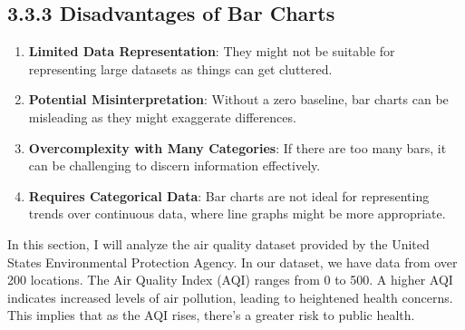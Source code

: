 \documentclass{article}\usepackage[]{graphicx}\usepackage[]{xcolor}
\begin{document}
\subsection*{3.3.3 Disadvantages of Bar Charts}

\begin{enumerate}
    \item \textbf{Limited Data Representation}: They might not be suitable for representing large datasets as things can get cluttered.
    
    \item \textbf{Potential Misinterpretation}: Without a zero baseline, bar charts can be misleading as they might exaggerate differences.
    
    \item \textbf{Overcomplexity with Many Categories}: If there are too many bars, it can be challenging to discern information effectively.
    
    \item \textbf{Requires Categorical Data}: Bar charts are not ideal for representing trends over continuous data, where line graphs might be more appropriate.
\end{enumerate}

In this section, I will analyze the air quality dataset provided by the United States Environmental Protection Agency. In our dataset, we have data from over 200 locations. The Air Quality Index (AQI) ranges from 0 to 500. A higher AQI indicates increased levels of air pollution, leading to heightened health concerns. This implies that as the AQI rises, there's a greater risk to public health.
\end{document}
